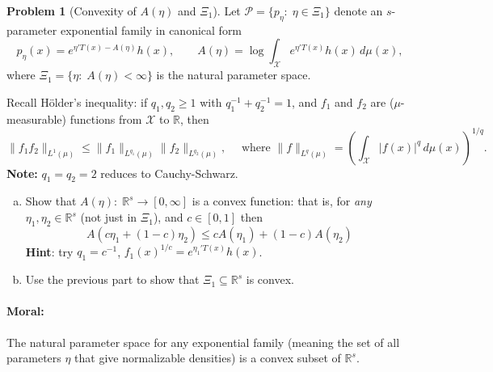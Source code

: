 \documentclass{article}
\newcommand{\cP}{\mathcal{P}}
\newcommand{\cX}{\mathcal{X}}
\newcommand{\RR}{\mathbb{R}}
\theoremstyle{definition}
\newtheorem{problem}{Problem}
\begin{document}
\begin{problem}[Convexity of $A(\eta)$ and $\Xi_1$]
Let $\cP=\{p_\eta:\; \eta \in \Xi_1\}$ denote an $s$-parameter exponential family in canonical form
\[
p_\eta(x) = e^{\eta'T(x) - A(\eta)}h(x), \qquad A(\eta) = \log\int_{\cX} e^{\eta'T(x)}h(x)\,d \mu(x),
\]
where $\Xi_1=\{\eta:\; A(\eta) < \infty\}$ is the natural parameter space. 

Recall H\"{o}lder's inequality: if $q_1,q_2\geq 1$ with $q_1^{-1} + q_2^{-1} = 1$, and $f_1$ and $f_2$ are ($\mu$-measurable) functions from $\cX$ to $\RR$, then
\[
\|f_1f_2\|_{L^1(\mu)} \leq \|f_1\|_{L^{q_1}(\mu)}\|f_2\|_{L^{q_2}(\mu)}, \quad \text{ where } \|f\|_{L^{q}(\mu)} = \left(\int_{\cX} |f(x)|^q\,d \mu(x)\right)^{1/q}.
\]
{\bf Note:} $q_1=q_2=2$ reduces to Cauchy-Schwarz.


\begin{enumerate}[(a)]
\item Show that $A(\eta):\;\RR^s \to [0,\infty]$ is a convex function: that is, for {\em any} $\eta_1,\eta_2\in \RR^s$ (not just in $\Xi_1$), and $c\in [0,1]$ then
  \begin{equation}\label{eq:ineq}
  A(c\eta_1 + (1-c)\eta_2) \leq c A(\eta_1) + (1-c) A(\eta_2)
  \end{equation}
  {\bf Hint}: try $q_1=c^{-1}$, $f_1(x)^{1/c}=e^{\eta_1'T(x)}h(x)$.

  


\item Use the previous part to show that $\Xi_1\subseteq \RR^s$ is convex. 

  
  


\end{enumerate}

\paragraph{Moral:} The natural parameter space for any exponential family (meaning the set of all parameters $\eta$ that give normalizable densities) is a convex subset of $\RR^s$.


\end{problem}
\end{document}

